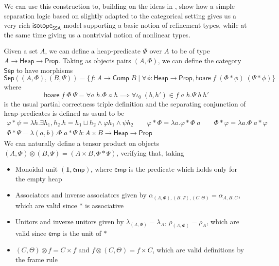 \documentclass[acmsmall,screen,review]{acmart}
\newcommand{\mb}[1]{\ensuremath{\mathbf{#1}}}
\newcommand{\ms}[1]{\ensuremath{\mathsf{#1}}}
\newcommand{\isotopessa}{\ms{isotope_{SSA}}}
\begin{document}
We can use this construction to, building on the ideas in \cite{mellies-ftrs},
show how a simple separation logic based on \cite{reynolds-separation-2002}
slightly adapted to the categorical setting gives us a very rich \isotopessa
model supporting a basic notion of refinement types, while at the same time
giving us a nontrivial notion of nonlinear types.

Given a set \(A\), we can define a heap-predicate \(\Phi\) over \(A\) to be of
type \(A \to \ms{Heap} \to \ms{Prop}\). Taking as objects pairs \((A, \Phi)\),
we can define the category \(\ms{Sep}\) to have morphisms
\begin{equation}
  \ms{Sep}((A, \Phi), (B, \Psi)) = \{f: A \to \ms{Comp}\;B 
    \mid \forall \phi: \ms{Heap} \to \ms{Prop}, \ms{hoare}\;f\;(\Phi \ast \phi)\;(\Psi \ast \phi)\}
\end{equation}
where
\begin{equation}
  \ms{hoare}\;f\;\Phi\;\Psi = \forall a\;h. \Phi\;a\;h \implies \forall \iota_0\;(b, h') \in f\;a\;h. \Psi\;b\;h'
\end{equation}
is the usual partial correctness triple definition and the separating
conjunction of heap-predicates is defined as usual to be 
\begin{equation}
  \begin{gathered}
  \varphi \ast \psi = \lambda h. \exists h_1, h_2. h = h_1 \sqcup h_2 \land \varphi h_1 \land \psi h_2 
  \qquad
  \varphi \ast \Phi = \lambda a. \varphi \ast \Phi\;a
  \qquad
  \Phi \ast \varphi = \lambda a. \Phi\;a \ast \varphi \\
  \Phi \ast \Psi = \lambda (a, b). \Phi\;a \ast \Psi\;b: A \times B \to \ms{Heap} \to \ms{Prop}
  \end{gathered}
\end{equation}
We can naturally define a tensor product on objects \((A, \Phi) \otimes (B,
\Psi) = (A \times B, \Phi \ast \Psi)\), verifying that, taking
\begin{itemize}
  \item Monoidal unit \((\mb{1}, \ms{emp})\), where \(\ms{emp}\) is the
  predicate which holds only for the empty heap
  \item Associators and inverse associators given by \(\alpha_{(A, \Phi), (B,
  \Psi), (C, \Theta)} = \alpha_{A, B, C}\), which are valid since \(\ast\) is
  associative
  \item Unitors and inverse unitors given by \(\lambda_{(A, \Phi)} =
  \lambda_A\), \(\rho_{(A, \Phi)} = \rho_A\), which are valid since \(\ms{emp}\)
  is the unit of \(\ast\)
  \item \((C, \Theta) \otimes f = C \times f\) and \(f \otimes (C, \Theta) = f
  \times C\), which are valid definitions by the frame rule
\end{itemize}
\end{document}
